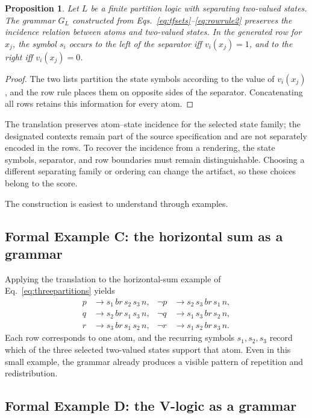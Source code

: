 \documentclass[
  10pt,
  twocolumn,
  aps,
  pra,
  showkeys,
  amsmath,amssymb,
  longbibliography
]{revtex4-2}
\newtheorem{proposition}{Proposition}
\begin{document}
\begin{proposition}
Let \(L\) be a finite partition logic with separating two-valued states. The grammar \(G_L\) constructed from Eqs.~\eqref{eq:tfsets}--\eqref{eq:rowrule2} preserves the incidence relation between atoms and two-valued states. In the generated row for \(x_j\), the symbol \(s_i\) occurs to the left of the separator iff \(v_i(x_j)=1\), and to the right iff \(v_i(x_j)=0\).
\end{proposition}

\begin{proof}
The two lists partition the state symbols according to the value of \(v_i(x_j)\), and the row rule places them on opposite sides of the separator. Concatenating all rows retains this information for every atom.
\end{proof}

The translation preserves atom--state incidence for the selected state family; the designated contexts remain part of the source specification and are not separately encoded in the rows. To recover the incidence from a rendering, the state symbols, separator, and row boundaries must remain distinguishable. Choosing a different separating family or ordering can change the artifact, so these choices belong to the score.

The construction is easiest to understand through examples.

\subsection{Formal Example C: the horizontal sum as a grammar}

Applying the translation to the horizontal-sum example of Eq.~\eqref{eq:threepartitions} yields
\begin{align}
p &\to s_1\,br\,s_2\,s_3\,n,
&
\neg p &\to s_2\,s_3\,br\,s_1\,n,
\nonumber\\
q &\to s_2\,br\,s_1\,s_3\,n,
&
\neg q &\to s_1\,s_3\,br\,s_2\,n,
\nonumber\\
r &\to s_3\,br\,s_1\,s_2\,n,
&
\neg r &\to s_1\,s_2\,br\,s_3\,n.
\label{eq:horizontalgrammar}
\end{align}
Each row corresponds to one atom, and the recurring symbols \(s_1,s_2,s_3\) record which of the three selected two-valued states support that atom. Even in this small example, the grammar already produces a visible pattern of repetition and redistribution.

\subsection{Formal Example D: the V-logic as a grammar}
\end{document}
